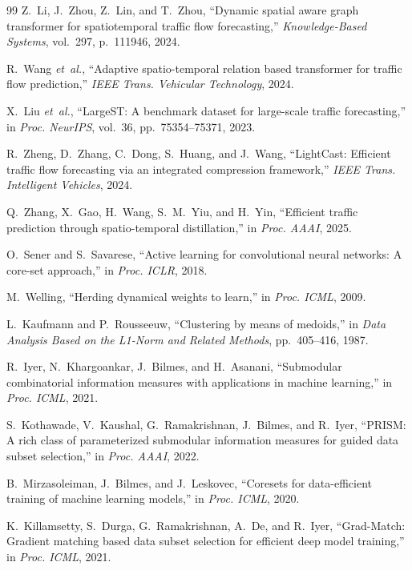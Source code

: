 \documentclass[journal]{IEEEtran}
\begin{document}
\begin{thebibliography}{99}
Z.~Li, J.~Zhou, Z.~Lin, and T.~Zhou,
``Dynamic spatial aware graph transformer for spatiotemporal traffic flow forecasting,''
\emph{Knowledge-Based Systems}, vol.~297, p.~111946, 2024.

R.~Wang \emph{et~al.},
``Adaptive spatio-temporal relation based transformer for traffic flow prediction,''
\emph{IEEE Trans. Vehicular Technology}, 2024.

X.~Liu \emph{et~al.},
``LargeST: A benchmark dataset for large-scale traffic forecasting,''
in \emph{Proc. NeurIPS}, vol.~36, pp.~75354--75371, 2023.

R.~Zheng, D.~Zhang, C.~Dong, S.~Huang, and J.~Wang,
``LightCast: Efficient traffic flow forecasting via an integrated compression framework,''
\emph{IEEE Trans. Intelligent Vehicles}, 2024.

Q.~Zhang, X.~Gao, H.~Wang, S.~M.~Yiu, and H.~Yin,
``Efficient traffic prediction through spatio-temporal distillation,''
in \emph{Proc. AAAI}, 2025.

O.~Sener and S.~Savarese,
``Active learning for convolutional neural networks: A core-set approach,''
in \emph{Proc. ICLR}, 2018.

M.~Welling,
``Herding dynamical weights to learn,''
in \emph{Proc. ICML}, 2009.

L.~Kaufmann and P.~Rousseeuw,
``Clustering by means of medoids,''
in \emph{Data Analysis Based on the L1-Norm and Related Methods},
pp.~405--416, 1987.

R.~Iyer, N.~Khargoankar, J.~Bilmes, and H.~Asanani,
``Submodular combinatorial information measures with applications in machine learning,''
in \emph{Proc. ICML}, 2021.

S.~Kothawade, V.~Kaushal, G.~Ramakrishnan, J.~Bilmes, and R.~Iyer,
``PRISM: A rich class of parameterized submodular information measures for guided data subset selection,''
in \emph{Proc. AAAI}, 2022.

B.~Mirzasoleiman, J.~Bilmes, and J.~Leskovec,
``Coresets for data-efficient training of machine learning models,''
in \emph{Proc. ICML}, 2020.

K.~Killamsetty, S.~Durga, G.~Ramakrishnan, A.~De, and R.~Iyer,
``Grad-Match: Gradient matching based data subset selection for efficient deep model training,''
in \emph{Proc. ICML}, 2021.


\end{thebibliography}
\end{document}
